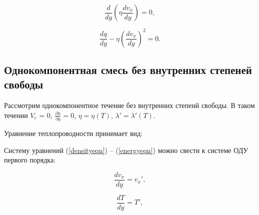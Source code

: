 \documentclass[12pt]{article}
\begin{document}
\begin{equation}
  \frac{d}{d y}\left(\eta \frac{d v_{x}}{d y} \right) = 0,\label{motioneqn}
\end{equation}

\begin{equation}
  \frac{d q}{d y} - \eta \left(\frac{d v_{x}}{d y} \right)^2 = 0.\label{energyeqn}
\end{equation}

\subsection{Однокомпонентная смесь без внутренних степеней свободы}
Рассмотрим однокомпонентное течение без внутренних степенй свободы.
В таком течении $V_{c}$ = 0, $\frac{\partial n}{\partial y} = 0$, $\eta=\eta(T)$, $\lambda'=\lambda'(T)$.


Уравнение теплопроводности принимает вид:


Систему уравнений (\ref{densityeqn}) -- (\ref{energyeqn}) можно свести к системе ОДУ первого порядка:


\begin{equation}
  \frac{d v_{x}}{d y} = v_{x}',\label{eqn-dimensional-dv}
\end{equation}

\begin{equation}
  \frac{d T}{d y} = T',\label{eqn-dimensional-dT}
\end{equation}
\end{document}
